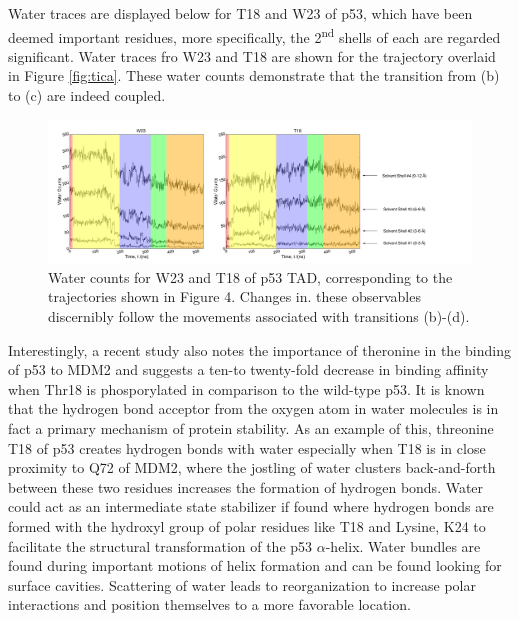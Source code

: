 Water traces are displayed below for T18 and W23 of p53, which have been deemed important residues, more specifically, the 2\textsuperscript{nd} shells of each are regarded significant.  Water traces fro W23 and T18 are shown for the trajectory overlaid in Figure \ref{fig:tica}.  These water counts demonstrate that the transition from (b) to (c) are indeed coupled.


\begin{figure}[h!]
\centering
\includegraphics[scale=0.25]{Figures/Water_counts/Water_counts.pdf}
\caption{Water counts for W23 and T18 of p53 TAD,
corresponding to the trajectories shown in Figure 4. Changes in. these
observables discernibly follow the movements associated with transitions
(b)-(d).}
\label{fig:water_counts}
\end{figure}



Interestingly, a recent study \cite{yadahalli2019kinetic} also notes the importance of theronine in the binding of p53 to MDM2 and suggests a ten-to twenty-fold decrease in binding affinity when Thr18 is phosporylated in comparison to the wild-type p53.  It is known that the hydrogen bond acceptor from the oxygen atom in water molecules is in fact a primary mechanism of protein stability. As an example of this, threonine T18 of p53 creates hydrogen bonds with water especially when T18 is in close proximity to Q72 of MDM2, where the jostling of water clusters back-and-forth between these two residues increases the formation of hydrogen bonds.  Water could act as an intermediate state stabilizer if found where hydrogen bonds are formed with the hydroxyl group of polar residues like T18 and Lysine, K24 to facilitate the structural transformation of the p53 $\alpha$-helix. Water bundles are found during important motions of helix formation and can be found looking for surface cavities. Scattering of water leads to reorganization to increase polar interactions and position themselves to a more favorable location.











